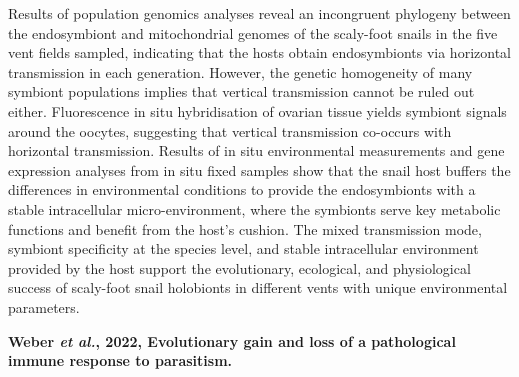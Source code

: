 \documentclass[11pt]{article}
\begin{document}
\begin{sloppypar}
Results of population genomics analyses reveal an incongruent phylogeny between the endosymbiont and mitochondrial genomes of the scaly-foot snails in the five vent fields sampled, indicating that the hosts obtain endosymbionts via horizontal transmission in each generation. 
However, the genetic homogeneity of many symbiont populations implies that vertical transmission cannot be ruled out either. 
Fluorescence in situ hybridisation of ovarian tissue yields symbiont signals around the oocytes, suggesting that vertical transmission co-occurs with horizontal transmission. 
Results of in situ environmental measurements and gene expression analyses from in situ fixed samples show that the snail host buffers the differences in environmental conditions to provide the endosymbionts with a stable intracellular micro-environment, where the symbionts serve key metabolic functions and benefit from the host's cushion. 
The mixed transmission mode, symbiont specificity at the species level, and stable intracellular environment provided by the host support the evolutionary, ecological, and physiological success of scaly-foot snail holobionts in different vents with unique environmental parameters.
\par
\textbf{Weber \textit{et al.}, 2022, Evolutionary gain and loss of a pathological immune response to parasitism.}


  
\end{sloppypar}
\end{document}
